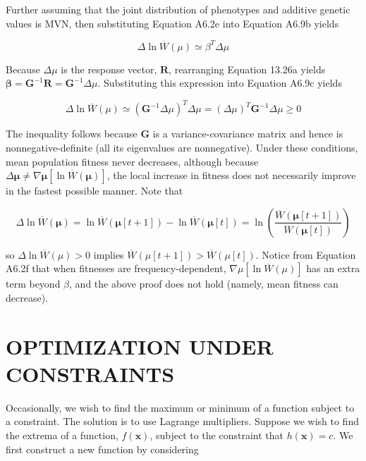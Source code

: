 \documentclass{article}
\begin{document}
Further assuming that the joint distribution of phenotypes and additive genetic values is MVN, then substituting Equation A6.2e into Equation A6.9b yields

\begin{equation}
\Delta\ln\overline{W}(\mu)\simeq\beta^{T}\Delta\mu
\end{equation}

Because  $ \Delta\mu $ is the response vector,  $ \mathbf{R} $, rearranging Equation 13.26a yields  $ \boldsymbol{\beta} = \mathbf{G}^{-1}\mathbf{R} = \mathbf{G}^{-1}\Delta\mu $. Substituting this expression into Equation A6.9c yields

\begin{equation}
\Delta\ln\overline{W}(\mu)\simeq\left(\mathbf{G}^{-1}\Delta\mu\right)^{T}\Delta\mu=\left(\Delta\mu\right)^{T}\mathbf{G}^{-1}\Delta\mu\geq0
\end{equation}

The inequality follows because  $ \mathbf{G} $ is a variance-covariance matrix and hence is nonnegative-definite (all its eigenvalues are nonnegative). Under these conditions, mean population fitness never decreases, although because  $ \Delta\boldsymbol{\mu} \neq \nabla\boldsymbol{\mu}[\ln \overline{W}(\boldsymbol{\mu})] $, the local increase in fitness does not necessarily improve in the fastest possible manner. Note that

\begin{equation}
\Delta\ln\overline{W}(\boldsymbol{\mu})=\ln\overline{W}(\boldsymbol{\mu}[t+1])-\ln\overline{W}(\boldsymbol{\mu}[t])=\ln\left(\frac{\overline{W}(\boldsymbol{\mu}[t+1])}{\overline{W}(\boldsymbol{\mu}[t])}\right)
\end{equation}

so $\Delta \ln \overline{W}(\mu) > 0$ implies $\overline{W}(\mu[t+1]) > \overline{W}(\mu[t]).$ Notice from Equation A6.2f that when fitnesses are frequency-dependent, $\nabla \mu[\ln \overline{W}(\mu)]$ has an extra term beyond $\beta$, and the above proof does not hold (namely, mean fitness can decrease).

\section{OPTIMIZATION UNDER CONSTRAINTS}
Occasionally, we wish to find the maximum or minimum of a function subject to a constraint. The solution is to use Lagrange multipliers. Suppose we wish to find the extrema of a function,  $ f(\mathbf{x}) $, subject to the constraint that  $ h(\mathbf{x}) = c $. We first construct a new function by considering
\end{document}

